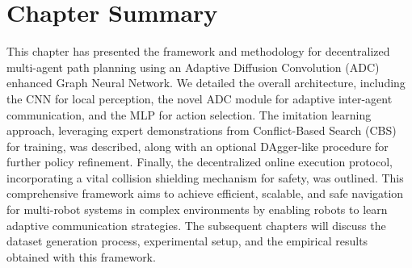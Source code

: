 \section{Chapter Summary}

This chapter has presented the framework and methodology for decentralized multi-agent path planning using an Adaptive Diffusion Convolution (ADC) enhanced Graph Neural Network. We detailed the overall architecture, including the CNN for local perception, the novel ADC module for adaptive inter-agent communication, and the MLP for action selection. The imitation learning approach, leveraging expert demonstrations from Conflict-Based Search (CBS) for training, was described, along with an optional DAgger-like procedure for further policy refinement. Finally, the decentralized online execution protocol, incorporating a vital collision shielding mechanism for safety, was outlined. This comprehensive framework aims to achieve efficient, scalable, and safe navigation for multi-robot systems in complex environments by enabling robots to learn adaptive communication strategies. The subsequent chapters will discuss the dataset generation process, experimental setup, and the empirical results obtained with this framework.